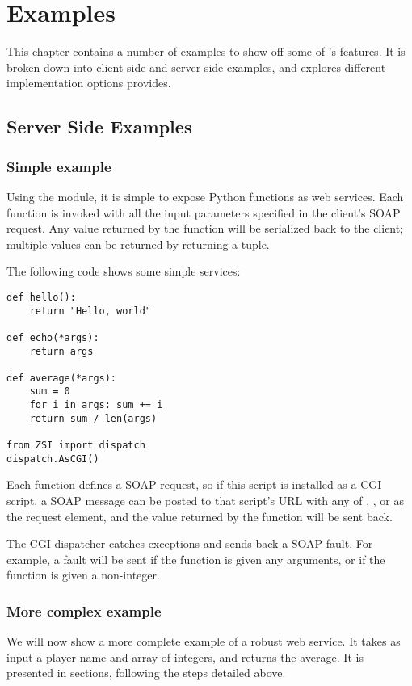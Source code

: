 \chapter{Examples}

This chapter contains a number of examples to show off some of \ZSI{}'s
features.
It is broken down into client-side and server-side examples, and
explores different implementation options \ZSI{} provides.

\section{Server Side Examples}
\subsection{Simple example}
Using the  module, it is simple to expose Python
functions as web services.
Each function is invoked with all the input parameters specified in the
client's SOAP request.
Any value returned by the function will be serialized back to the client;
multiple values can be returned by returning a tuple.

The following code shows some simple services:

\begin{verbatim}
def hello():
    return "Hello, world"

def echo(*args):
    return args

def average(*args):
    sum = 0
    for i in args: sum += i
    return sum / len(args)

from ZSI import dispatch
dispatch.AsCGI()
\end{verbatim}

Each function defines a SOAP request, so if this script is installed
as a CGI script, a SOAP message can be posted to that script's URL with any of
, , or  as the request element,
and the value returned by the function will be sent back.

The \ZSI{} CGI dispatcher catches exceptions and sends back a SOAP fault.
For example, a fault will be sent if the   function is given any
arguments, or if the  function is given a non-integer.

\subsection{More complex example}

We will now show a more complete example of a robust web service.
It takes as input a player name and array of integers, and returns
the average.
It is presented in sections, following the steps detailed above.

